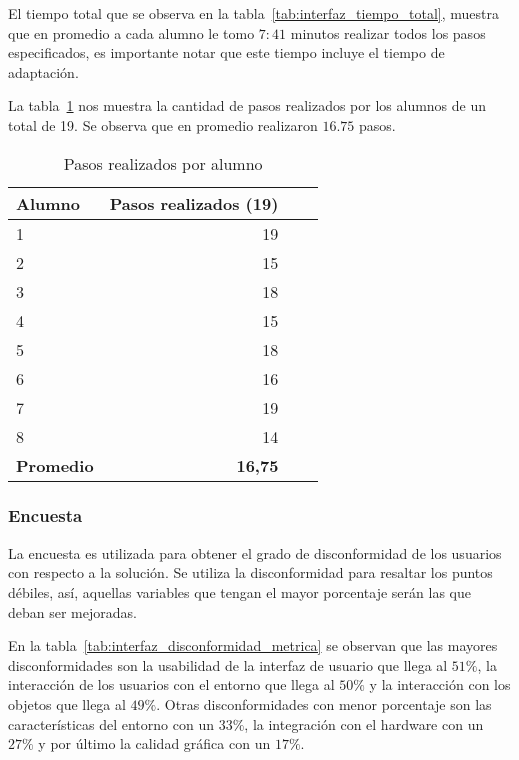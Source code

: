 El tiempo total que se observa en la tabla~\ref{tab:interfaz_tiempo_total},
muestra que en promedio a cada alumno le tomo $7:41$ minutos realizar todos los
pasos especificados, es importante notar que este tiempo incluye el tiempo de
adaptación. 

La tabla~\ref{tab:interfaz_acciones} nos muestra la cantidad de pasos
realizados por los alumnos de un total de 19. Se observa que en promedio 
realizaron $16.75$ pasos.

\begin{table}[H]
\centering
\begin{tabular}{lrrr}
\toprule
\textbf{Alumno} & \textbf{Pasos realizados (19)} \\
\midrule
1 & 19 \\
2 & 15 \\
3 & 18 \\
4 & 15 \\
5 & 18 \\
6 & 16 \\
7 & 19 \\
8 & 14 \\
\midrule
\textbf{Promedio} & \textbf{16,75} \\
\bottomrule
\end{tabular}
\caption{Pasos realizados por alumno}
\label{tab:interfaz_acciones}
\end{table}



\subsubsection{Encuesta}


La encuesta es utilizada para obtener el grado de
disconformidad de los usuarios con respecto a la solución. Se utiliza la disconformidad 
para resaltar los puntos débiles, así, aquellas variables que tengan el mayor porcentaje serán
las que deban ser mejoradas.


En la tabla~\ref{tab:interfaz_disconformidad_metrica} se observan que las mayores 
disconformidades son la usabilidad de la interfaz de usuario que llega al $51\%$, la 
interacción de los usuarios con el entorno que llega al $50\%$ y la interacción con los 
objetos que llega al $49\%$. Otras disconformidades con menor porcentaje son las
características del entorno con un  $33\%$, la integración con el hardware con
un $27\%$ y por último la calidad gráfica con un $17\%$.

